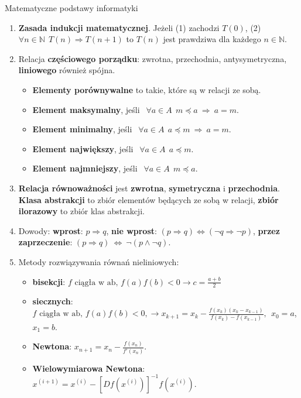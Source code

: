 \documentclass[12pt]{article}
\begin{document}
    \begin{center}{\LARGE Matematyczne podstawy informatyki}\end{center}

    \begin{enumerate}
        \item \textbf{Zasada indukcji matematycznej}.
        Jeżeli (1) zachodzi $T(0)$, (2) $\forall n \in \mathbb{N} ~~ T(n) \Rightarrow T(n+1)$
        to $T(n)$ jest prawdziwa dla każdego $n \in \mathbb{N}$.

        \item Relacja \textbf{częściowego porządku}: zwrotna, przechodnia, antysymetryczna, \textbf{liniowego} również
        spójna.
        \begin{itemize}[noitemsep]
            \item \textbf{Elementy porównywalne} to takie, które są w relacji ze sobą.
            \item \textbf{Element maksymalny}, jeśli $~~ \forall a \in A ~~ m \preceq a ~ \Rightarrow  ~ a = m$.
            \item \textbf{Element minimalny}, jeśli $~~ \forall a \in A ~~ a \preceq m ~ \Rightarrow  ~ a = m$.
            \item \textbf{Element największy}, jeśli $~~ \forall a \in A ~~ a \preceq m$.
            \item \textbf{Element najmniejszy}, jeśli $~~ \forall a \in A ~~ m \preceq a$.
        \end{itemize}

        \item \textbf{Relacja równoważności} jest \textbf{zwrotna}, \textbf{symetryczna} i \textbf{przechodnia}.
        \textbf{Klasa abstrakcji} to zbiór elementów będących ze sobą w relacji, \textbf{zbiór ilorazowy} to zbiór
        klas abstrakcji.

        \item Dowody: \textbf{wprost}:  $ p \Rightarrow q$, \textbf{nie wprost}:  $(p \Rightarrow q) \Leftrightarrow (\neg q \Rightarrow \neg p)$,
        \textbf{przez zaprzeczenie}: $(p \Rightarrow q) ~ \Leftrightarrow ~ \neg(p \wedge \neg q)$.

        \item Metody rozwiązywania równań nieliniowych:
        \begin{itemize}[noitemsep]
            \item \textbf{bisekcji}: $f \text{ ciągła w ab, } f(a)f(b)<0 \rightarrow c = \frac{a+b}{2}$
            \item \textbf{siecznych}: $f  \text{ ciągła w ab, } f(a)f(b)<0, \rightarrow
            x_{k+1} = x_k - \frac{f(x_k)(x_k - x_{k-1})}{f(x_k) - f(x_{k-1})}, ~~ x_0 = a$, $x_1 = b$.
            \item \textbf{Newtona}: $x_{n+1} = x_n - \frac{f(x_n)}{f'(x_n)}$.
            \item \textbf{Wielowymiarowa Newtona}: $x^{(i+1)} = x^{(i)} - [Df(x^{(i)})]^{-1} f(x^{(i)})$.
        \end{itemize}


\end{enumerate}
\end{document}
